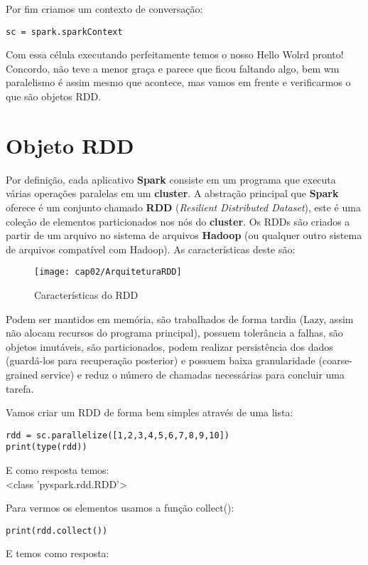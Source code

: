 Por fim criamos um contexto de conversação:
\begin{lstlisting}[]
sc = spark.sparkContext
\end{lstlisting}

Com essa célula executando perfeitamente temos o nosso Hello Wolrd pronto! Concordo, não teve a menor graça e parece que ficou faltando algo, bem wm paralelismo é assim mesmo que acontece, mas vamos em frente e verificarmos o que são objetos RDD.

\section{Objeto RDD}
Por definição, cada aplicativo \textbf{Spark} consiste em um programa que executa várias operações paralelas em um \textbf{cluster}. A abstração principal que \textbf{Spark} oferece é um conjunto chamado \textbf{RDD} (\textit{Resilient Distributed Dataset}), este é uma coleção de elementos particionados nos nós do \textbf{cluster}. Os RDDs são criados a partir de um arquivo no sistema de arquivos \textbf{Hadoop} (ou qualquer outro sistema de arquivos compatível com Hadoop). As características deste são:
\begin{figure}[H]
	\centering\texttt{[image: cap02/ArquiteturaRDD]}
	\caption{Características do RDD}
\end{figure}

Podem ser mantidos em memória, são trabalhados de forma tardia (Lazy, assim não alocam recursos do programa principal), possuem tolerância a falhas, são objetos imutáveis, são particionados, podem realizar persistência dos dados (guardá-los para recuperação posterior) e possuem baixa granularidade (coarse-grained service) e reduz o número de chamadas necessárias para concluir uma tarefa.

Vamos criar um RDD de forma bem simples através de uma lista:
\begin{lstlisting}[]
rdd = sc.parallelize([1,2,3,4,5,6,7,8,9,10])
print(type(rdd))
\end{lstlisting}

E como resposta temos: \\
{\ttfamily <class 'pyspark.rdd.RDD'>}

Para vermos os elementos usamos a função collect():
\begin{lstlisting}[]
print(rdd.collect())
\end{lstlisting}

E temos como resposta: \\
{\ttfamily [1, 2, 3, 4, 5, 6, 7, 8, 9, 10]}


